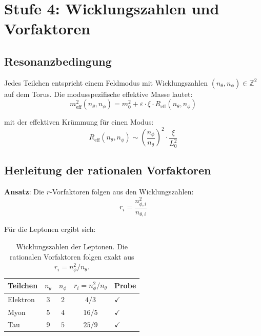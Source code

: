 \section{Stufe 4: Wicklungszahlen und Vorfaktoren}

\subsection{Resonanzbedingung}

Jedes Teilchen entspricht einem Feldmodus mit Wicklungszahlen
$(n_\theta, n_\phi) \in \mathbb{Z}^2$ auf dem Torus. Die
modusspezifische effektive Masse lautet:
\begin{equation}
    m_{\mathrm{eff}}^2(n_\theta, n_\phi)
    = m_0^2 + \varepsilon \cdot \xi \cdot R_{\mathrm{eff}}(n_\theta, n_\phi)
\end{equation}

mit der effektiven Krümmung für einen Modus:
\begin{equation}
    R_{\mathrm{eff}}(n_\theta, n_\phi)
    \sim \left(\frac{n_\phi}{n_\theta}\right)^2 \cdot \frac{\xi}{L_0^2}
\end{equation}

\subsection{Herleitung der rationalen Vorfaktoren}

\textbf{Ansatz}: Die $r$-Vorfaktoren folgen aus den Wicklungszahlen:
\begin{equation}
    \boxed{r_i = \frac{n_{\phi,i}^2}{n_{\theta,i}}}
    \label{eq:r_winding}
\end{equation}

Für die Leptonen ergibt sich:

\begin{table}[htbp]
\centering
\begin{tabular}{lcccl}
\toprule
\textbf{Teilchen} & $n_\theta$ & $n_\phi$ & $r_i = n_\phi^2/n_\theta$
& \textbf{Probe} \\
\midrule
Elektron & $3$ & $2$ & $4/3$  & $\checkmark$ \\
Myon     & $5$ & $4$ & $16/5$ & $\checkmark$ \\
Tau      & $9$ & $5$ & $25/9$ & $\checkmark$ \\
\bottomrule
\end{tabular}
\caption{Wicklungszahlen der Leptonen. Die rationalen Vorfaktoren folgen
exakt aus $r_i = n_\phi^2 / n_\theta$.}
\label{tab:leptonen_wicklung}
\end{table}

